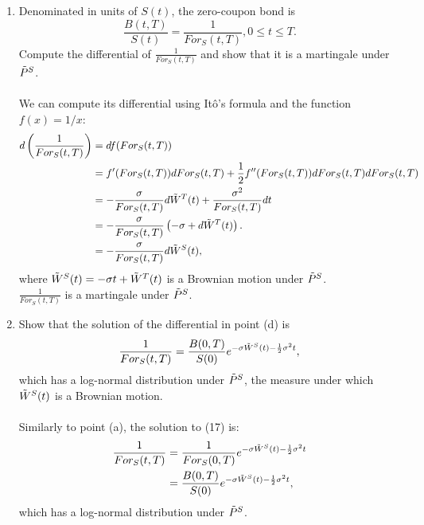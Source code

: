 \documentclass[11pt,a4,table]{article}
\begin{document}
\begin{enumerate}
\begin{enumerate}
        \item Denominated in units of $S(t)$, the zero-coupon bond is
        \begin{equation*}
            \frac{B(t,T)}{S(t)}=\frac{1}{For_S(t,T)}, 0\leq t \leq T.
        \end{equation*}
        Compute the differential of $\frac{1}{For_S(t,T)}$ and show that it is a martingale under $\Tilde{P}^S$.\\\\
        We can compute its differential using Itô's formula and the function $f(x)=1/x$:
        \begin{align}
            d\left(\frac{1}{For_S(t,T)}\right) &= df(For_S(t,T)) \nonumber\\
            &= f'(For_S(t,T)) dFor_S(t,T) + \frac{1}{2}f''(For_S(t,T)) dFor_S(t,T) dFor_S(t,T) \nonumber\\
            &= -\frac{\sigma}{For_S(t,T)} d\Tilde{W}^T(t) + \frac{\sigma^2}{For_S(t,T)} dt \nonumber\\
            &= -\frac{\sigma}{For_S(t,T)}\left(-\sigma + d\Tilde{W}^T(t)\right). \nonumber\\
            &= -\frac{\sigma}{For_S(t,T)} d\Tilde{W}^S(t),
        \end{align}
        where $\Tilde{W}^S(t) = -\sigma t + \Tilde{W}^T(t)$ is a Brownian motion under $\Tilde{P}^S$.\\
        $\frac{1}{For_S(t,T)}$ is a martingale under $\Tilde{P}^S$.
        
        \item Show that the solution of the differential in point (d) is
        \begin{equation*}
            \frac{1}{For_S(t,T)} = \frac{B(0,T)}{S(0)}e^{-\sigma\Tilde{W}^S(t)-\frac{1}{2}\sigma^2t},
        \end{equation*}
        which has a log-normal distribution under $\Tilde{P}^S$, the measure under which $\Tilde{W}^S(t)$ is a Brownian motion.\\\\
        Similarly to point (a), the solution to (17) is:
        \begin{align}
            \frac{1}{For_S(t,T)} &= \frac{1}{For_S(0,T)}e^{-\sigma\Tilde{W}^S(t)-\frac{1}{2}\sigma^2t} \nonumber\\ &=\frac{B(0,T)}{S(0)}e^{-\sigma\Tilde{W}^S(t)-\frac{1}{2}\sigma^2t},
        \end{align}
        which has a log-normal distribution under $\Tilde{P}^S$.
    \end{enumerate}
    

\end{enumerate}
\end{document}
